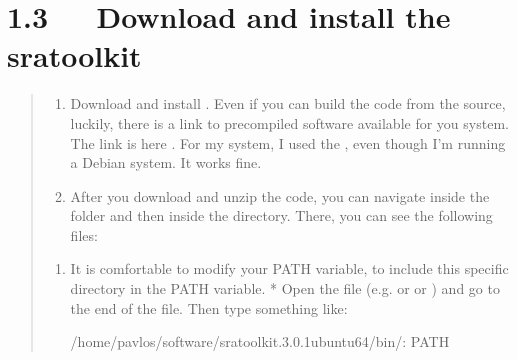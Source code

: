 \documentclass[letterpaper,10pt,english]{sphinxmanual}
\let\sphinxpxdimen\pdfpxdimen\else\newdimen\sphinxpxdimen
\begin{document}
\chapter{1.3   Download and install the sra\sphinxhyphen{}toolkit}
\label{\detokenize{index:download-and-install-the-sra-toolkit}}\begin{quote}
\begin{enumerate}
%
\item {} 
\sphinxAtStartPar
Download and install .
Even if you can build the code from the source, luckily, there is a link to pre\sphinxhyphen{}compiled software available for you system. The link is here . For my system, I used the , even though I’m running a Debian system. It works fine.

\item {} 
\sphinxAtStartPar
After you download and unzip the code, you can navigate inside the  folder and then inside the  directory. There, you can see the following files:

\end{enumerate}

\noindent\sphinxincludegraphics[width=800\sphinxpxdimen]{{sradir}.png}
\begin{enumerate}
%
\item {} 
\sphinxAtStartPar
It is comfortable to modify your PATH variable, to include this specific directory in the PATH variable.
* Open the  file (e.g.  or  or ) and go to the end of the file. Then type something like:

\begin{sphinxVerbatim}[commandchars=\\\{\}]
/home/pavlos/software/sratoolkit.3.0.1\PYGZhy{}ubuntu64/bin/:
 PATH
\end{sphinxVerbatim}


\end{enumerate}
\end{quote}
\end{document}
